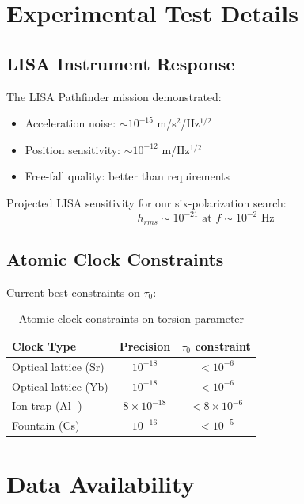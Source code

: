 \documentclass[12pt,a4paper]{article}
\begin{document}
\section{Experimental Test Details}

\subsection{LISA Instrument Response}

The LISA Pathfinder mission demonstrated:
\begin{itemize}
    \item Acceleration noise: $\sim 10^{-15}$ m/s$^2$/Hz$^{1/2}$
    \item Position sensitivity: $\sim 10^{-12}$ m/Hz$^{1/2}$
    \item Free-fall quality: better than requirements
\end{itemize}

Projected LISA sensitivity for our six-polarization search:
\begin{equation}
    h_{rms} \sim 10^{-21} \text{ at } f \sim 10^{-2} \text{ Hz}
\end{equation}

\subsection{Atomic Clock Constraints}

Current best constraints on $\tau_0$:

\begin{table}[h]
\centering
\begin{tabular}{lcc}
\toprule
Clock Type & Precision & $\tau_0$ constraint \\
\midrule
Optical lattice (Sr) & $10^{-18}$ & $< 10^{-6}$ \\
Optical lattice (Yb) & $10^{-18}$ & $< 10^{-6}$ \\
Ion trap (Al$^+$) & $8\times 10^{-18}$ & $< 8\times 10^{-6}$ \\
Fountain (Cs) & $10^{-16}$ & $< 10^{-5}$ \\
\bottomrule
\end{tabular}
\caption{Atomic clock constraints on torsion parameter}
\end{table}

\section{Data Availability}
\end{document}
